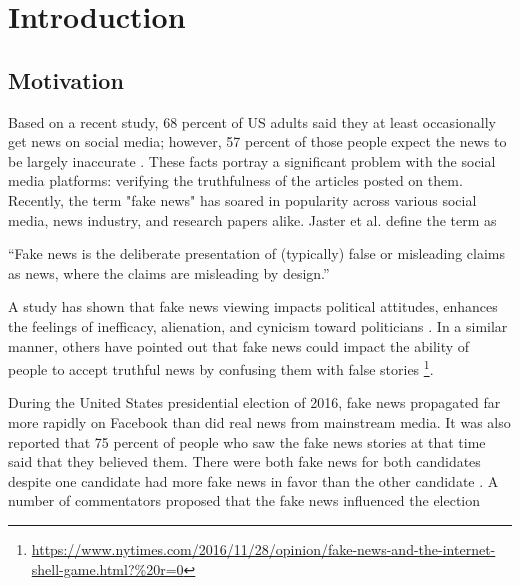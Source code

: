 \chapter{Introduction}\label{introduction}

\section{Motivation}\label{intro:motivation}
\cite{WinNT}
Based on a recent study, 68 percent of US adults said they at least occasionally get news on social media; however, 57 percent of those people expect the news to be largely inaccurate \cite{matsa2018news}. These facts portray a significant problem with the social media platforms: verifying the truthfulness of the articles posted on them. Recently, the term "fake news" has soared in popularity across various social media, news industry, and research papers alike. Jaster et al. define the term as \cite{gelfert2018fake}

\enquote{Fake news is the deliberate presentation of (typically) false or misleading claims as news, where the claims are misleading by design.}

\noindent
A study has shown that fake news viewing impacts political attitudes, enhances the feelings of inefficacy, alienation, and cynicism toward politicians \cite{balmas2014fake}. In a similar manner, others have pointed out that fake news could impact the ability of people to accept truthful news by confusing them with false stories \footnote{\url{https://www.nytimes.com/2016/11/28/opinion/fake-news-and-the-internet-shell-game.html?\%20r=0}}.

During the United States presidential election of 2016, fake news propagated far more rapidly on Facebook than did real news from mainstream media\cite{silverman2016analysis}. It was also reported that 75 percent of people who saw the fake news stories at that time said that they believed them\cite{silverman2016most}. There were both fake news for both candidates despite one candidate had more fake news in favor than the other candidate \cite{silverman2016analysis}. A number of commentators proposed that the fake news influenced the election  \cite{parkinson2016click, read2016donald, dewey2016facebook}

